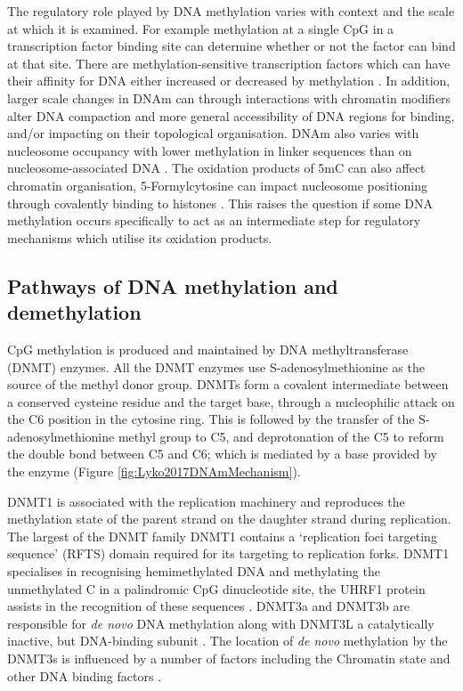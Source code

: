\documentclass[
]{book}
\begin{document}
The regulatory role played by DNA methylation varies with context and the scale at which it is examined. For example methylation at a single CpG in a transcription factor binding site can determine whether or not the factor can bind at that site. There are methylation-sensitive transcription factors which can have their affinity for DNA either increased or decreased by methylation \citep[\citet{Zuo2017}]{Yin2017}. In addition, larger scale changes in DNAm can through interactions with chromatin modifiers alter DNA compaction and more general accessibility of DNA regions for binding, and/or impacting on their topological organisation. DNAm also varies with nucleosome occupancy with lower methylation in linker sequences than on nucleosome-associated DNA \citep[\citet{Huff2014}]{Kelly2012}. The oxidation products of 5mC can also affect chromatin organisation, 5-Formylcytosine can impact nucleosome positioning through covalently binding to histones \citep{Raiber2017}. This raises the question if some DNA methylation occurs specifically to act as an intermediate step for regulatory mechanisms which utilise its oxidation products.

\hypertarget{pathways-of-dna-methylation-and-demethylation}{%
\subsection{Pathways of DNA methylation and demethylation}\label{pathways-of-dna-methylation-and-demethylation}}

CpG methylation is produced and maintained by DNA methyltransferase (DNMT) enzymes. All the DNMT enzymes use S-adenosylmethionine as the source of the methyl donor group. DNMTs form a covalent intermediate between a conserved cysteine residue and the target base, through a nucleophilic attack on the C6 position in the cytosine ring. This is followed by the transfer of the S-adenosylmethionine methyl group to C5, and deprotonation of the C5 to reform the double bond between C5 and C6; which is mediated by a base provided by the enzyme (Figure \ref{fig:Lyko2017DNAmMechanism}).

DNMT1 is associated with the replication machinery \citep{Vertino2002} and reproduces the methylation state of the parent strand on the daughter strand during replication. The largest of the DNMT family DNMT1 contains a `replication foci targeting sequence' (RFTS) domain required for its targeting to replication forks. DNMT1 specialises in recognising hemimethylated DNA and methylating the unmethylated C in a palindromic CpG dinucleotide site, the UHRF1 protein assists in the recognition of these sequences \citep{Bostick2007}. DNMT3a and DNMT3b are responsible for \emph{de novo} DNA methylation along with DNMT3L a catalytically inactive, but DNA-binding subunit \citep{Jia2009}. The location of \emph{de novo} methylation by the DNMT3s is influenced by a number of factors including the Chromatin state and other DNA binding factors \citep{Lyko2017}.
\end{document}
